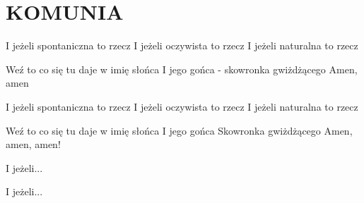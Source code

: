 \documentclass[../../../songbook.tex]{subfiles}
\begin{document}
\TabPositions{8cm} %
\section*{KOMUNIA}
{}
\vspace{0.5cm}
\-\hspace{1cm} I jeżeli spontaniczna to rzecz  \newline
\-\hspace{1cm} I jeżeli oczywista to rzecz		 \newline
\-\hspace{1cm} I jeżeli naturalna to rzecz		 \newline

Weź to co się tu daje w imię słońca  \newline
I jego gońca - skowronka gwiżdżącego		 \newline
Amen, amen		 \newline

\-\hspace{1cm} I jeżeli spontaniczna to rzecz 		 \newline
\-\hspace{1cm} I jeżeli oczywista to rzecz		 \newline
\-\hspace{1cm} I jeżeli naturalna to rzecz		 \newline

Weź to co się tu daje w imię słońca		 \newline
I jego gońca		 \newline
Skowronka gwiżdżącego		 \newline
Amen, amen, amen!		 \newline

\-\hspace{1cm} I jeżeli...		 \newline

\-\hspace{1cm} I jeżeli...		 \newline
\end{document}
